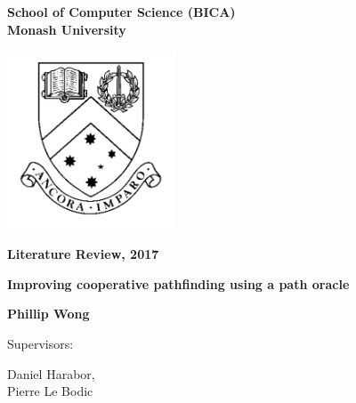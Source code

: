 \documentclass[a4paper,11pt]{article}
\begin{document}
\thispagestyle{empty} %
\renewcommand{\thepage}{\roman{page}}

\begin{spacing}{1.5}
\begin{center}
{\Large \bfseries
School of Computer Science (BICA) \\
Monash University}


\vspace*{30mm}

\includegraphics[width=5cm]{graphics/MonashCrest.pdf}

\vspace*{15mm}

{\large \bfseries
Literature Review, 2017
}

\vspace*{10mm}

{\LARGE \bfseries
Improving cooperative pathfinding using a path oracle
}

\vspace*{20mm}

{\large \bfseries
Phillip Wong

\vspace*{20mm}


Supervisors: \parbox[t]{50mm}{Daniel Harabor,\\Pierre Le Bodic}
}

\end{center}
\end{spacing}

\newpage

\tableofcontents

\newpage
\setcounter{page}{1}
\renewcommand{\thepage}{\arabic{page}}
\end{document}
